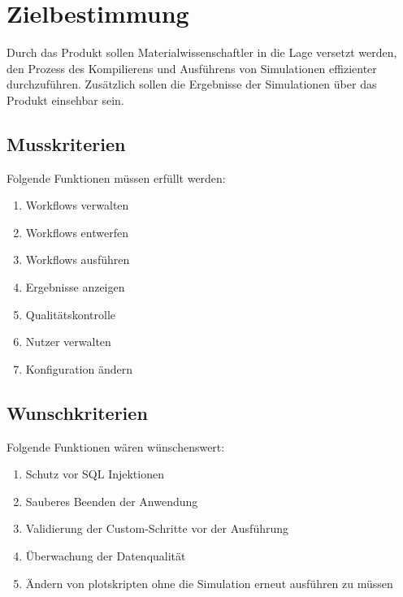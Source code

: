 \chapter{Zielbestimmung}
Durch das Produkt sollen Materialwissenschaftler in die Lage versetzt werden, den Prozess des Kompilierens und Ausführens von Simulationen effizienter durchzuführen. 
Zusätzlich sollen die Ergebnisse der Simulationen über das Produkt einsehbar sein. \newline
\section{Musskriterien}
Folgende Funktionen müssen erfüllt werden:
\renewcommand{\labelenumi}{/M\arabic{enumi}0/}
\begin{enumerate}
    \setlength\itemsep{-1em}
    \item Workflows verwalten
    \item Workflows entwerfen %
    \item Workflows ausführen
    \item Ergebnisse anzeigen
    \item Qualitätskontrolle
    \item Nutzer verwalten
    \item Konfiguration ändern
\end{enumerate}
\newpage
\section{Wunschkriterien}
Folgende Funktionen wären wünschenswert:
\renewcommand{\labelenumi}{/W\arabic{enumi}0/}
\begin{enumerate}
    \setlength\itemsep{-1em}
    \item Schutz vor SQL Injektionen
    \item Sauberes Beenden der Anwendung
    \item Validierung der Custom-Schritte vor der Ausführung
    \item Überwachung der Datenqualität
    \item Ändern von plotskripten ohne die Simulation erneut ausführen zu müssen
\end{enumerate}

